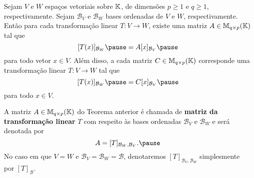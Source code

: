 \documentclass{beamer}
\begin{document}
    \begin{frame}
        \begin{teorema}
            Sejam $V$ e $W$ espaços vetoriais sobre $\mathbb{K}$, \pause de dimensões $p \ge 1$ e $q \ge 1$, respectivamente. \pause Sejam
            $\mathcal{B}_V$ e $\mathcal{B}_W$ bases ordenadas de $V$ e $W$, respectivamente. \pause Então para cada transformação linear
            $T \colon V \to W$, \pause existe uma matriz $A \in \mathbb{M}_{q\times p}(\mathbb{K})$ tal que\pause
            \[
                [T(x)]_{\mathcal{B}_W} \pause = A[x]_{\mathcal{B}_V}\pause
            \]
            para todo vetor $x \in V$. \pause Além disso, \pause a cada matriz $C \in \mathbb{M}_{q\times p}(\mathbb{K})$ \pause corresponde uma
            transformação linear $T \colon V \to W$ tal que\pause
            \[
                [T(x)]_{\mathcal{B}_W} \pause = C[x]_{\mathcal{B}_V}\pause
            \]
            para todo $x \in V$.
        \end{teorema}
    \end{frame}

    \begin{frame}
        \begin{definicao}
            A matriz $A \in \mathbb{M}_{q\times p}(\mathbb{K})$ do Teorema anterior \pause é chamada de \textbf{matriz da transformação linear}
            \pause $T$ com respeito às bases ordenadas $\mathcal{B}_V$ e $\mathcal{B}_W$ \pause e será denotada por\pause
            \[
                A = [T]_{\mathcal{B}_{W},\mathcal{B}_{V}}.\pause
            \]
            No caso em que $V = W$ \pause e $\mathcal{B}_V = \mathcal{B}_W = \mathcal{B}$, \pause denotaremos $[T]_{\mathcal{B}_{V},\mathcal{B}_{W}}$
            \pause simplesmente por $[T]_\mathcal{B}$.
        \end{definicao}
    \end{frame}
\end{document}

